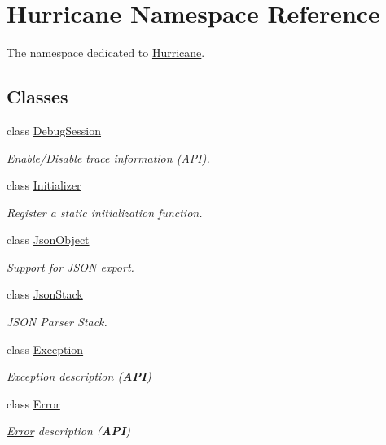 \hypertarget{namespaceHurricane}{\section{Hurricane Namespace Reference}
\label{namespaceHurricane}
}


The namespace dedicated to \hyperlink{namespaceHurricane}{Hurricane}.  


\subsection*{Classes}
\begin{DoxyCompactItemize}
\item 
class \hyperlink{classHurricane_1_1DebugSession}{Debug\-Session}
\begin{DoxyCompactList}\small\item\em Enable/\-Disable trace information ({\ttfamily A\-P\-I}). \end{DoxyCompactList}\item 
class \hyperlink{classHurricane_1_1Initializer}{Initializer}
\begin{DoxyCompactList}\small\item\em Register a static initialization function. \end{DoxyCompactList}\item 
class \hyperlink{classHurricane_1_1JsonObject}{Json\-Object}
\begin{DoxyCompactList}\small\item\em Support for J\-S\-O\-N export. \end{DoxyCompactList}\item 
class \hyperlink{classHurricane_1_1JsonStack}{Json\-Stack}
\begin{DoxyCompactList}\small\item\em J\-S\-O\-N Parser Stack. \end{DoxyCompactList}\item 
class \hyperlink{classHurricane_1_1Exception}{Exception}
\begin{DoxyCompactList}\small\item\em \hyperlink{classHurricane_1_1Exception}{Exception} description ({\bfseries A\-P\-I}) \end{DoxyCompactList}\item 
class \hyperlink{classHurricane_1_1Error}{Error}
\begin{DoxyCompactList}\small\item\em \hyperlink{classHurricane_1_1Error}{Error} description ({\bfseries A\-P\-I}) \end{DoxyCompactList}\item 

\end{DoxyCompactItemize}
